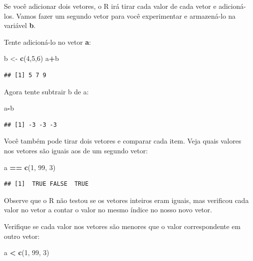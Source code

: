 \documentclass[
]{book}
\newenvironment{Shaded}{\begin{snugshade}}{\end{snugshade}}
\newcommand{\DecValTok}[1]{\textcolor[rgb]{0.00,0.00,0.81}{#1}}
\newcommand{\KeywordTok}[1]{\textcolor[rgb]{0.13,0.29,0.53}{\textbf{#1}}}
\newcommand{\NormalTok}[1]{#1}
\newcommand{\OperatorTok}[1]{\textcolor[rgb]{0.81,0.36,0.00}{\textbf{#1}}}
\newcommand{\StringTok}[1]{\textcolor[rgb]{0.31,0.60,0.02}{#1}}
\begin{document}
Se você adicionar dois vetores, o R irá tirar cada valor de cada vetor e adicioná-los. Vamos fazer um segundo vetor para você experimentar e armazená-lo na variável \textbf{b}.

Tente adicioná-lo no vetor \textbf{a}:

\begin{Shaded}
\begin{Highlighting}[]
\NormalTok{b <-}\StringTok{ }\KeywordTok{c}\NormalTok{(}\DecValTok{4}\NormalTok{,}\DecValTok{5}\NormalTok{,}\DecValTok{6}\NormalTok{)}
\NormalTok{a}\OperatorTok{+}\NormalTok{b}
\end{Highlighting}
\end{Shaded}

\begin{verbatim}
## [1] 5 7 9
\end{verbatim}

Agora tente subtrair b de a:

\begin{Shaded}
\begin{Highlighting}[]
\NormalTok{a}\OperatorTok{-}\NormalTok{b}
\end{Highlighting}
\end{Shaded}

\begin{verbatim}
## [1] -3 -3 -3
\end{verbatim}

Você também pode tirar dois vetores e comparar cada item. Veja quais valores nos vetores são iguais aos de um segundo vetor:

\begin{Shaded}
\begin{Highlighting}[]
\NormalTok{a }\OperatorTok{==}\StringTok{ }\KeywordTok{c}\NormalTok{(}\DecValTok{1}\NormalTok{, }\DecValTok{99}\NormalTok{, }\DecValTok{3}\NormalTok{)}
\end{Highlighting}
\end{Shaded}

\begin{verbatim}
## [1]  TRUE FALSE  TRUE
\end{verbatim}

Observe que o R não testou se os vetores inteiros eram iguais, mas verificou cada valor no vetor a contar o valor no mesmo índice no nosso novo vetor.

Verifique se cada valor nos vetores são menores que o valor correspondente em outro vetor:

\begin{Shaded}
\begin{Highlighting}[]
\NormalTok{a }\OperatorTok{<}\StringTok{ }\KeywordTok{c}\NormalTok{(}\DecValTok{1}\NormalTok{, }\DecValTok{99}\NormalTok{, }\DecValTok{3}\NormalTok{)}
\end{Highlighting}
\end{Shaded}
\end{document}
